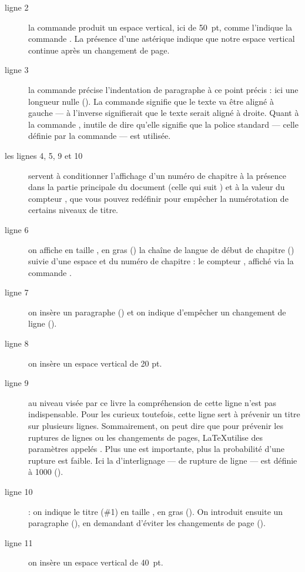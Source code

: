 \begin{description}
\item[ligne 2]la commande   produit un espace vertical, ici de 50~pt, comme l'indique la commande . La présence d'une astérique indique que notre espace vertical continue après un changement de page.
\item[ligne 3]la commande  précise l'indentation de paragraphe à ce point précis : ici une longueur nulle (). La commande  signifie que le texte va être aligné à gauche --- à l'inverse  signifierait que le texte serait aligné à droite. Quant à la commande , inutile de dire qu'elle signifie que la police standard --- celle définie par la commande  --- est utilisée.
\item[les lignes 4, 5, 9 et 10] servent à conditionner l'affichage d'un numéro de chapitre à la présence dans la partie principale du document (celle qui suit ) et à la valeur du compteur , que vous pouvez redéfinir pour empêcher la numérotation de certains niveaux de titre.
\item[ligne 6] on affiche en taille , en gras () la chaîne de langue de début de chapitre () suivie d'une espace et du numéro de chapitre : le compteur , affiché via la commande .
\item[ligne 7] on insère un paragraphe () et on indique d'empêcher un changement de ligne ().
\item[ligne 8] on insère un espace vertical de 20 pt.
\item[ligne 9] au niveau visée par ce livre la compréhension de cette ligne n'est pas indispensable. Pour les curieux toutefois, cette ligne sert à prévenir un titre sur plusieurs lignes. Sommairement, on peut dire que pour prévenir les ruptures de lignes ou les changements de pages, \LaTeX utilise des paramètres appelés . Plus une  est importante, plus la probabilité d'une rupture est faible. Ici la  d'interlignage --- de rupture de ligne --- est définie à 1000 (). 
\item[ligne 10]: on indique le titre (\#1) en taille , en gras (). On introduit ensuite un paragraphe (), en demandant d'éviter les changements de page ().
\item[ligne 11]on insère un espace vertical de 40~pt.
\end{description}

